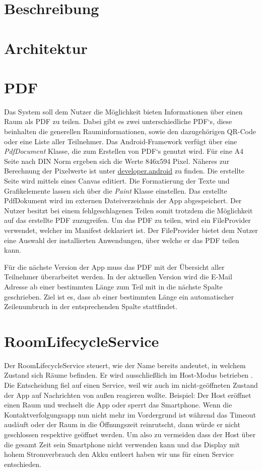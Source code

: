 \sloppy
\section{Beschreibung}

\label{sec:Allgemeine Beschreibung}
\section{Architektur}
\label{sec:Architektur}
\section{PDF}
\label{sec:PDF}
Das System soll dem Nutzer die Möglichkeit bieten Informationen über einen Raum als PDF zu teilen. Dabei gibt es zwei unterschiedliche PDF‘s, diese beinhalten die generellen Rauminformationen, sowie den dazugehörigen QR-Code oder eine Liste aller Teilnehmer.
Das Android-Framework  verfügt über eine \textit{PdfDocument} Klasse, die zum Erstellen von PDF‘s genutzt wird. Für eine A4 Seite nach DIN Norm ergeben sich die Werte 846x594 Pixel. Näheres zur Berechnung der Pixelwerte ist unter \href{https://developer.android.com/reference/android/graphics/pdf/PdfDocument.PageInfo}{developer.android} zu finden. Die erstellte Seite wird mittels eines Canvas editiert. Die Formatierung  der Texte und Grafikelemente lassen sich über die \textit{Paint} Klasse einstellen.
Das erstellte PdfDokument wird im externen Dateiverzeichnis der App abgespeichert. Der Nutzer besitzt bei einem fehlgeschlagenen Teilen somit trotzdem die Möglichkeit auf das erstellte PDF zuzugreifen.
Um das PDF zu teilen, wird ein FileProvider verwendet, welcher im Manifest deklariert ist.  Der FileProvider bietet dem Nutzer eine Auswahl der installierten Anwendungen, über welche er das PDF teilen kann.

Für die nächste Version der App muss das PDF mit der Übersicht aller Teilnehmer überarbeitet werden. In der aktuellen Version wird die E-Mail Adresse ab einer bestimmten Länge zum Teil mit in die nächste Spalte geschrieben. Ziel ist es, dass ab einer bestimmten Länge ein automatischer Zeilenumbruch in der entsprechenden Spalte stattfindet.

\section{RoomLifecycleService}
\label{sec:RoomLifecycleService}
Der RoomLifecycleService steuert, wie der Name bereits andeutet, in welchem Zustand sich Räume befinden. Er wird ausschließlich im Host-Modus betrieben .
Die Entscheidung fiel auf einen Service, weil wir auch im nicht-geöffneten Zustand der App auf Nachrichten von außen reagieren wollte. 
Beispiel: Der Host eröffnet einen Raum und wechselt die App oder sperrt das Smartphone. Wenn die Kontaktverfolgungsapp nun nicht mehr im Vordergrund ist während das Timeout ausläuft oder der Raum in die Öffnungszeit reinrutscht, dann würde er nicht geschlossen respektive geöffnet werden. Um also zu vermeiden dass der Host über die gesamt Zeit sein Smartphone nicht verwenden kann und das Display mit hohem Stromverbrauch den Akku entleert haben wir uns für einen Service entschieden. 

